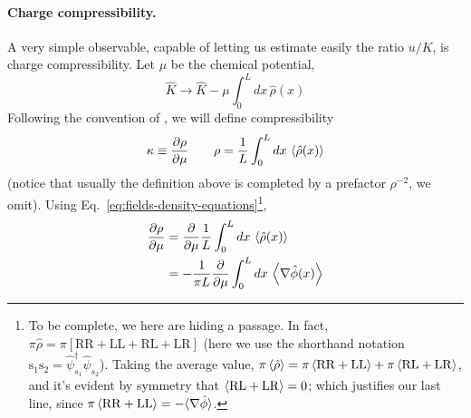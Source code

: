 \paragraph{Charge compressibility.}

A very simple observable, capable of letting us estimate easily the ratio $u/K$, is charge compressibility. Let $\mu$ be the chemical potential,
\[
	\hat K \to \hat K - \mu \int_0^L dx \, \hat \rho(x)
\]
Following the convention of \citeauthor{giamarchi2003quantum}, we will define compressibility
\[
	\kappa \equiv \pdv{\rho}{\mu}
	\qquad
	\rho = \frac{1}{L} \int_0^L dx \, \ev{\hat \rho(x)}
\]
(notice that usually the definition above is completed by a prefactor $\rho^{-2}$, we omit). Using Eq.~\eqref{eq:fields-density-equations}\footnote{
	To be complete, we here are hiding a passage. In fact, $\pi \hat \rho = \pi \left[ \mathrm{RR} + \mathrm{LL} + \mathrm{RL} + \mathrm{LR} \right]$ (here we use the shorthand notation $\mathrm{s}_1 \mathrm{s}_2 = \hat \psi_{s_1}^\dagger \hat \psi_{s_2}$). Taking the average value, $\pi \ev{\hat \rho} = \pi \ev{ \mathrm{RR} + \mathrm{LL}} + \pi \ev{\mathrm{RL} + \mathrm{LR}}$, and it's evident by symmetry that $\ev{\mathrm{RL} + \mathrm{LR}} = 0$; which justifies our last line, since $\pi \ev{ \mathrm{RR} + \mathrm{LL}} = - \langle \nabla \hat \phi \rangle$.
},
\[
\begin{aligned}
	\pdv{\rho}{\mu} &= \pdv{}{\mu} \frac{1}{L} \int_0^L dx \, \ev{\hat \rho(x)} \\
	&= - \frac{1}{\pi L} \pdv{}{\mu} \int_0^L dx \, \ev{\nabla \hat \phi(x)}
\end{aligned}
\]

